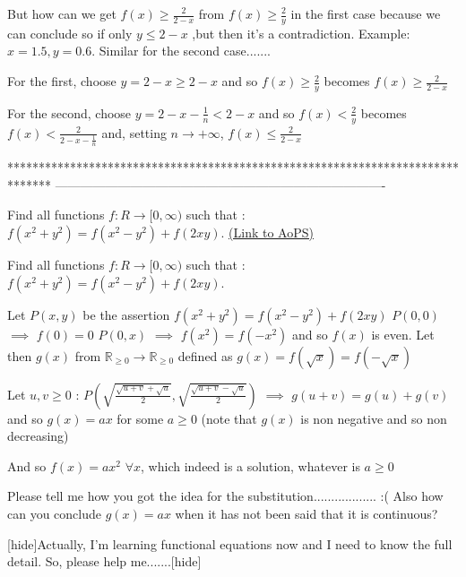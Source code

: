 \begin{solution}
	\begin{tcolorbox}But how can we get $f(x)\ge \frac{2}{2-x}$ from $f(x)\ge \frac{2}{y}$ in the first case because we can conclude so if only $y \le 2-x$ ,but then it's a contradiction. Example: $x=1.5, y=0.6$. 
Similar for the second case.......\end{tcolorbox}
For the first, choose $y=2-x\ge 2-x$ and so $f(x)\ge\frac 2y$ becomes $f(x)\ge \frac 2{2-x}$

For the second, choose $y=2-x-\frac 1n<2-x$ and so $f(x)<\frac 2y$ becomes $f(x)< \frac 2{2-x-\frac 1n}$ and, setting $n\to+\infty$,  $f(x)\le \frac 2{2-x}$
\end{solution}
*******************************************************************************
-------------------------------------------------------------------------------

\begin{problem}
	Find all functions $f:R \to [0, \infty )$ such that :
$f(x^2 + y^2) = f(x^2-y^2) + f(2xy)$.
	\flushright \href{https://artofproblemsolving.com/community/c6h619238}{(Link to AoPS)}
\end{problem}



\begin{solution}
	\begin{tcolorbox}Find all functions $f:R \to [0, \infty )$ such that :
$f(x^2 + y^2) = f(x^2-y^2) + f(2xy)$.\end{tcolorbox}
Let $P(x,y)$ be the assertion $f(x^2+y^2)=f(x^2-y^2)+f(2xy)$
$P(0,0)$ $\implies$ $f(0)=0$
$P(0,x)$ $\implies$ $f(x^2)=f(-x^2)$ and so $f(x)$ is even.
Let then $g(x)$ from $\mathbb R_{\ge 0}\to\mathbb R_{\ge 0}$ defined as $g(x)=f(\sqrt x)=f(-\sqrt x)$

Let $u,v\ge 0$ : $P(\sqrt{\frac{\sqrt{u+v}+\sqrt u}2},\sqrt{\frac{\sqrt{u+v}-\sqrt u}2})$ $\implies$ $g(u+v)=g(u)+g(v)$ and so $g(x)=ax$ for some $a\ge 0$ (note that $g(x)$ is non negative and so non decreasing)

And so $\boxed{f(x)=ax^2}$ $\forall x$, which indeed is a solution, whatever is $a\ge 0$
\end{solution}



\begin{solution}
	Please tell me how you got the idea for the substitution.................. :(
Also how can you conclude $g(x)=ax$ when it has not been said that it is continuous?

[hide]Actually, I'm learning functional equations now and I need to know the full detail. So, please help me.......[\/hide]
\end{solution}




